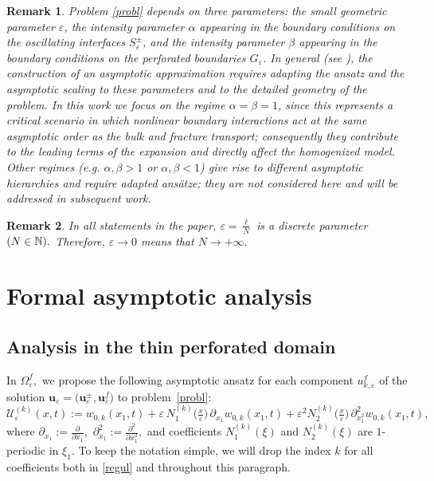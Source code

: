 \documentclass[reqno]{amsart}            %
\newtheorem{remark}{Remark}[section]
\numberwithin{equation}{section}
\begin{document}
	\begin{remark}\label{remark-2-6}
		Problem \eqref{probl} depends on three parameters: the small geometric parameter \(\varepsilon\), the intensity parameter \(\alpha\) appearing in the boundary conditions on the oscillating interfaces \(S^\pm_\varepsilon\), and the intensity parameter \(\beta\) appearing in the boundary conditions on the perforated boundaries \(G_\varepsilon\). In general (see \cite{Mel-Roh_AsAn-2024,Mel-Roh_JMAA-2024}), the construction of an asymptotic approximation requires adapting the ansatz and the asymptotic scaling to these parameters and to the detailed geometry of the problem. In this work we focus on the regime \(\alpha=\beta=1\), since this represents a critical scenario in which nonlinear boundary interactions act at the same asymptotic order as the bulk and fracture transport; consequently they contribute to the leading terms of the expansion and directly affect the homogenized model. 
		Other regimes (e.g. \(\alpha,\beta>1\) or \(\alpha,\beta<1\)) give rise to different asymptotic hierarchies and require adapted ansätze; they are not considered here and will be addressed in subsequent work.
	\end{remark}
	
	\begin{remark}\label{rem-2-4}
		In all statements in the paper,  $\varepsilon= \frac{\ell}{N}$ is a discrete parameter $(N\in \Bbb N).$  Therefore, $\varepsilon \to 0$
		means that $N \to +\infty.$
	\end{remark}
	
	
	
	
	\section{Formal asymptotic analysis}\label{Sect-3}
	
	\subsection{Analysis in the thin perforated domain}\label{Par-4-1}
	
	In  $\Omega^f_\varepsilon,$ we propose the following  asymptotic ansatz for each component $u_{k, \varepsilon}^f$ of the 
	solution $\mathbf{u}_\varepsilon = \big(\mathbf{u}^\pm_\varepsilon, \mathbf{u}^f_\varepsilon \big)$ to problem~\eqref{probl}:
	\begin{equation}\label{regul}
		\mathcal{U}^{(k)}_\varepsilon(x,t) :=  w_{0,k}(x_1,t) + \varepsilon\, N^{(k)}_1\big(\tfrac{x}{\varepsilon}\big) \, \partial_{x_1}w_{0,k}(x_1,t)
		+ \varepsilon^2 N^{(k)}_{2}\big(\tfrac{x}{\varepsilon}\big) \, \partial^2_{x_1^2}w_{0,k}(x_1,t),
	\end{equation}
	where $\partial_{x_1} := \frac{\partial}{\partial x_1},$ $\partial^2_{x_1} := \frac{\partial^2}{\partial x^2_1},$ and coefficients $N^{(k)}_1(\xi)$ and $N^{(k)}_{2}(\xi)$ are $1$-periodic in $\xi_1.$
	To keep the notation simple, we will drop the index $k$ for all coefficients both in \eqref{regul} and throughout this paragraph.
	
\end{document}
